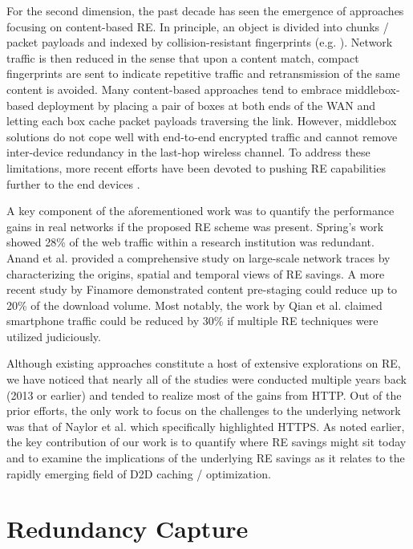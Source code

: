 \documentclass{sig-alternate}
\begin{document}
For the second dimension, the past decade has seen the emergence of approaches focusing on content-based RE. In principle, an object is divided into chunks / packet payloads and indexed by collision-resistant fingerprints (e.g. \cite{Rabin:1981}). Network traffic is then reduced in the sense that upon a content match, compact fingerprints are sent to indicate repetitive traffic and retransmission of the same content is avoided. Many content-based approaches tend to embrace middlebox-based deployment by placing a pair of boxes at both ends of the WAN and letting each box cache packet payloads traversing the link. However, middlebox solutions do not cope well with end-to-end encrypted traffic and cannot remove inter-device redundancy in the last-hop wireless channel. To address these limitations, more recent efforts have been devoted to pushing RE capabilities further to the end devices \cite{EndRE:2010, Sanadhya:2012}.

A key component of the aforementioned work was to quantify the performance gains in real networks if the proposed RE scheme was present. Spring's work \cite{Spring:2000} showed 28\% of the web traffic within a research institution was redundant. Anand et al. \cite{Anand:2009} provided a comprehensive study on large-scale network traces by characterizing the origins, spatial and temporal views of RE savings. A more recent study by Finamore \cite{Finamore:2013} demonstrated content pre-staging could reduce up to 20\% of the download volume. Most notably, the work by Qian et al. \cite{Qian:2013} claimed smartphone traffic could be reduced by 30\% if multiple RE techniques were utilized judiciously.  

Although existing approaches constitute a host of extensive explorations on RE, we have noticed that nearly all of the studies were conducted multiple years back (2013 or earlier) and tended to realize most of the gains from HTTP. Out of the prior efforts, the only work to focus on the challenges to the underlying network was that of Naylor et al. \cite{Naylor:2014} which specifically highlighted HTTPS. As noted earlier, the key contribution of our work is to quantify where RE savings might sit today and to examine the implications of the underlying RE savings as it relates to the rapidly emerging field of D2D caching / optimization.  


\section{Redundancy Capture} \label{Sec:RedundancyCapture}
\end{document}
